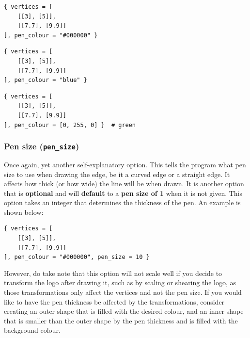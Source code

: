 \documentclass[11pt]{article}
\begin{document}
\begin{verbatim}
{ vertices = [
    [[3], [5]],
    [[7.7], [9.9]]
], pen_colour = "#000000" }
\end{verbatim}

\begin{verbatim}
{ vertices = [
    [[3], [5]],
    [[7.7], [9.9]]
], pen_colour = "blue" }
\end{verbatim}

\begin{verbatim}
{ vertices = [
    [[3], [5]],
    [[7.7], [9.9]]
], pen_colour = [0, 255, 0] }  # green
\end{verbatim}

 \newpage

\subsubsection{Pen size (\texttt{pen\_size})}
\label{sec:orgb5afec3}
Once again, yet another self-explanatory option. This tells the program what pen size to use when drawing the edge, be it a curved edge or a straight edge. It affects how thick (or how wide) the line will be when drawn. It is another option that is \textbf{optional} and will \textbf{default} to a \textbf{pen size of 1} when it is not given. This option takes an integer that determines the thickness of the pen. An example is shown below:

\begin{verbatim}
{ vertices = [
    [[3], [5]],
    [[7.7], [9.9]]
], pen_colour = "#000000", pen_size = 10 }
\end{verbatim}

 \noindent However, do take note that this option will not scale well if you decide to transform the logo after drawing it, such as by scaling or shearing the logo, as those transformations only affect the vertices and not the pen size. If you would like to have the pen thickness be affected by the transformations, consider creating an outer shape that is filled with the desired colour, and an inner shape that is smaller than the outer shape by the pen thickness and is filled with the background colour.

 \newpage
\end{document}
